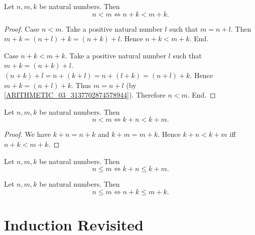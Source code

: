 \documentclass[10pt]{article}
\begin{document}
  \begin{forthel}
    \begin{proposition}
      Let $n, m, k$ be natural numbers.
      Then \[ n < m \iff n + k < m + k. \]
    \end{proposition}
    \begin{proof}
      Case $n < m$.
        Take a positive natural number $l$ such that $m = n + l$.
        Then $m + k
          = (n + l) + k
          = (n + k) + l$.
        Hence $n + k < m + k$.
      End.

      Case $n + k < m + k$.
        Take a positive natural number $l$ such that $m + k = (n + k) + l$.
        $(n + k) + l
          = n + (k + l)
          = n + (l + k)
          = (n + l) + k$.
        Hence $m + k = (n + l) + k$.
        Thus $m = n + l$ (by \cref{ARITHMETIC_03_3137702874578944}).
        Therefore $n < m$.
      End.
    \end{proof}
  \end{forthel}

  \begin{forthel}
    \begin{corollary}
      Let $n, m, k$ be natural numbers.
      Then \[ n < m \iff k + n < k + m. \]
    \end{corollary}
    \begin{proof}
      We have $k + n = n + k$ and $k + m = m + k$.
      Hence $k + n < k + m$ iff $n + k < m + k$.
    \end{proof}
  \end{forthel}

  \begin{forthel}
    \begin{corollary}
      Let $n, m, k$ be natural numbers.
      Then \[ n \leq m \iff k + n \leq k + m. \]
    \end{corollary}
  \end{forthel}

  \begin{forthel}
    \begin{corollary}
      Let $n, m, k$ be natural numbers.
      Then \[ n \leq m \iff n + k \leq m + k. \]
    \end{corollary}
  \end{forthel}


  \section{Induction Revisited}
\end{document}
